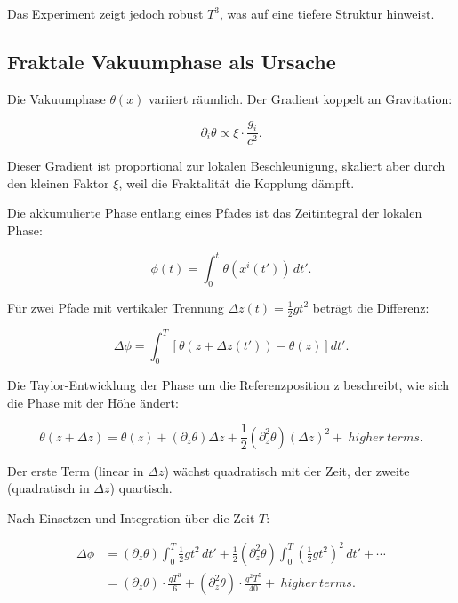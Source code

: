 	Das Experiment zeigt jedoch robust \(T^3\), was auf eine tiefere Struktur hinweist.
	
	\subsection*{Fraktale Vakuumphase als Ursache}
	
	Die Vakuumphase \(\theta(x)\) variiert räumlich. Der Gradient koppelt an Gravitation:
	
	\begin{equation}
		\partial_i \theta \propto \xi \cdot \frac{g_i}{c^2}.
	\end{equation}
	
	Dieser Gradient ist proportional zur lokalen Beschleunigung, skaliert aber durch den kleinen Faktor \(\xi\), weil die Fraktalität die Kopplung dämpft.
	
	Die akkumulierte Phase entlang eines Pfades ist das Zeitintegral der lokalen Phase:
	
	\begin{equation}
		\phi(t) = \int_0^t \theta(x^i(t')) \, dt'.
	\end{equation}
	
	Für zwei Pfade mit vertikaler Trennung \(\Delta z(t) = \frac{1}{2} g t^2\) beträgt die Differenz:
	
	\begin{equation}
		\Delta \phi = \int_0^T \left[ \theta(z + \Delta z(t')) - \theta(z) \right] dt'.
	\end{equation}
	
	Die Taylor-Entwicklung der Phase um die Referenzposition z beschreibt, wie sich die Phase mit der Höhe ändert:
	
	\begin{equation}
		\theta(z + \Delta z) = \theta(z) + (\partial_z \theta) \Delta z + \frac{1}{2} (\partial_z^2 \theta) (\Delta z)^2 + \ higher\ terms.
	\end{equation}
	
	Der erste Term (linear in \(\Delta z\)) wächst quadratisch mit der Zeit, der zweite (quadratisch in \(\Delta z\)) quartisch.
	
	Nach Einsetzen und Integration über die Zeit \(T\):
	
	\[
	\begin{aligned}
		\Delta \phi &= (\partial_z \theta) \int_0^T \frac{1}{2} g t^2 \, dt' + \frac{1}{2} (\partial_z^2 \theta) \int_0^T \left(\frac{1}{2} g t^2\right)^2 \, dt' + \cdots \\
		&= (\partial_z \theta) \cdot \frac{g T^3}{6} + (\partial_z^2 \theta) \cdot \frac{g^2 T^5}{40} + \ higher\ terms.
	\end{aligned}
	\]
	
